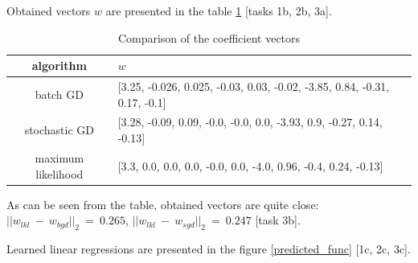 \documentclass{article}
\begin{document}
Obtained vectors $w$ are presented in the table \ref{vectors} [tasks 1b, 2b, 3a].

\begin{table}
\caption{Comparison of the coefficient vectors}
\label{vectors}
\begin{tabular}{|c|l|}
\hline
algorithm & $w$ \\
\hline
batch GD & [3.25, -0.026,  0.025, -0.03,  0.03,
       -0.02, -3.85,  0.84, -0.31,  0.17,
       -0.1] \\
\hline
stochastic GD & [3.28, -0.09,  0.09, -0.0,
       -0.0,  0.0, -3.93,  0.9,
       -0.27,  0.14, -0.13]\\
\hline
maximum likelihood & [3.3,  0.0, 0.0,  0.0,
       -0.0,  0.0, -4.0,  0.96,
       -0.4,  0.24, -0.13] \\
\hline
\end{tabular}
\end{table}

As can be seen from the table, obtained vectors are quite close: $||w_{lkl}~-~w_{bgd}||_2~=~0.265$, $||w_{lkl}~-~w_{sgd}||_2~=~0.247$ [task 3b].

Learned linear regressions are presented in the figure \ref{predicted_func} [1c, 2c, 3c].
\end{document}
